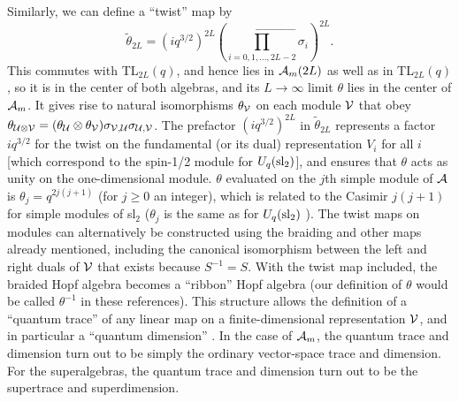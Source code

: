 \documentclass[twocolumn,floats,pra]{revtex4}
\def \cA {{\cal A}}
\newcommand {\be}{\begin{equation}}
\newcommand {\ee} {\end{equation}}
\begin{document}
Similarly, we can define a ``twist'' map by%
\be%
\widetilde{\theta}_{2L}=(iq^{3/2})^{2L}\left(\stackrel{\leftarrow}
{\prod_{i=0,1,\ldots,2L-2}}
\sigma_i\right)^{2L}.\ee%
This commutes with TL$_{2L}(q)$, and hence lies in $\cA_m(2L)$ as
well as in TL$_{2L}(q)$, so it is in the center of both algebras,
and its $L\to\infty$ limit $\theta$ lies in the center of $\cA_m$.
It gives rise to natural isomorphisms $\theta_{\cal V}$ on each
module $\cal V$ that obey $\theta_{{\cal U}\otimes{\cal
V}}=(\theta_{\cal U}\otimes\theta_{\cal V})\sigma_{{\cal V},{\cal
U}}\sigma_{{\cal U},{\cal V}}$. The prefactor $(iq^{3/2})^{2L}$ in
$\widetilde{\theta}_{2L}$ represents a factor $iq^{3/2}$ for the
twist on the fundamental (or its dual) representation $V_i$ for
all $i$ [which correspond to the spin-1/2 module for $U_q({\rm
sl}_2)$], and ensures that $\theta$ acts as unity on the
one-dimensional module. $\theta$ evaluated on the $j$th simple
module of $\cA$ is $\theta_j=q^{2j(j+1)}$ (for $j\geq0$ an
integer), which is related to the Casimir $j(j+1)$ for simple
modules of sl$_2$ ($\theta_j$ is the same as for $U_q({\rm sl}_2)$
\cite{bk}). The twist maps on modules can alternatively be
constructed using the braiding and other maps already mentioned,
including the canonical isomorphism between the left and right
duals of $\cal V$ that exists because $S^{-1}=S$. With the twist
map included, the braided Hopf algebra becomes a ``ribbon'' Hopf
algebra \cite{cp,kass,bk} (our definition of $\theta$ would be
called $\theta^{-1}$ in these references). This structure allows
the definition of a ``quantum trace'' of any linear map on a
finite-dimensional representation $\cal V$, and in particular a
``quantum dimension'' \cite{cp,kass,bk,turaev}. In the case of
$\cA_m$, the quantum trace and dimension turn out to be simply the
ordinary vector-space trace and dimension. For the superalgebras,
the quantum trace and dimension turn out to be the supertrace and
superdimension.
\end{document}
